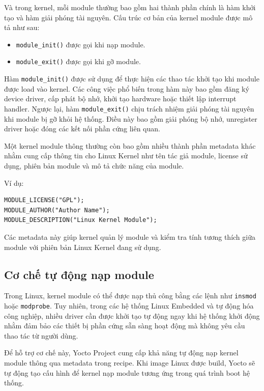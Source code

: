 Và trong kernel, mỗi module thường bao gồm hai thành phần chính là hàm khởi tạo và hàm giải phóng tài nguyên. Cấu trúc cơ bản của kernel module được mô tả như sau:

\begin{itemize}
    \item \texttt{module\_init()} được gọi khi nạp module.
    \item \texttt{module\_exit()} được gọi khi gỡ module.
\end{itemize}

Hàm \texttt{module\_init()} được sử dụng để thực hiện các thao tác khởi tạo khi module được load vào kernel. Các công việc phổ biến trong hàm này bao gồm đăng ký device driver, cấp phát bộ nhớ, khởi tạo hardware hoặc thiết lập interrupt handler. Ngược lại, hàm \texttt{module\_exit()} chịu trách nhiệm giải phóng tài nguyên khi module bị gỡ khỏi hệ thống. Điều này bao gồm giải phóng bộ nhớ, unregister driver hoặc đóng các kết nối phần cứng liên quan.

Một kernel module thông thường còn bao gồm nhiều thành phần metadata khác nhằm cung cấp thông tin cho Linux Kernel như tên tác giả module, license sử dụng, phiên bản module và mô tả chức năng của module.

\newpage
Ví dụ:

\begin{verbatim}
MODULE_LICENSE("GPL");
MODULE_AUTHOR("Author Name");
MODULE_DESCRIPTION("Linux Kernel Module");
\end{verbatim}

Các metadata này giúp kernel quản lý module và kiểm tra tính tương thích giữa module với phiên bản Linux Kernel đang sử dụng.

\subsection{Cơ chế tự động nạp module}

Trong Linux, kernel module có thể được nạp thủ công bằng các lệnh như \texttt{insmod} hoặc \texttt{modprobe}. Tuy nhiên, trong các hệ thống Linux Embedded và tự động hóa công nghiệp, nhiều driver cần được khởi tạo tự động ngay khi hệ thống khởi động nhằm đảm bảo các thiết bị phần cứng sẵn sàng hoạt động mà không yêu cầu thao tác từ người dùng.

Để hỗ trợ cơ chế này, Yocto Project cung cấp khả năng tự động nạp kernel module thông qua metadata trong recipe. Khi image Linux được build, Yocto sẽ tự động tạo cấu hình để kernel nạp module tương ứng trong quá trình boot hệ thống.

